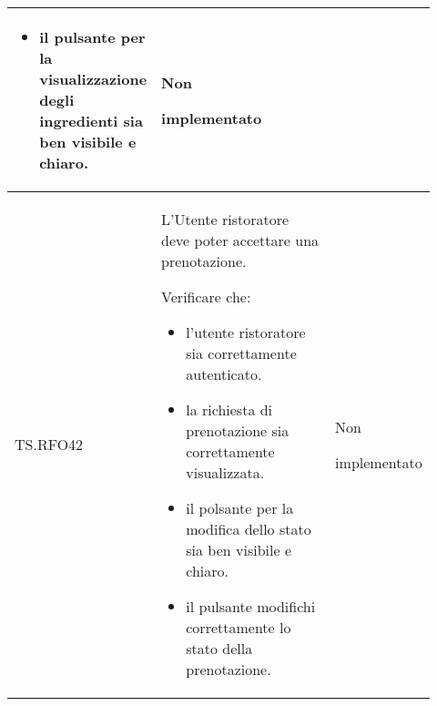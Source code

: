 \begin{longtable}{|p{0.10\linewidth}|p{0.70\linewidth}|p{0.12\linewidth}|}
\begin{itemize}
		\item il pulsante per la visualizzazione degli ingredienti sia ben visibile e chiaro.
	\end{itemize}                                           &
	Non \par implementato                                                                                                                                                   \\
	\hline
	TS.RFO42                                                                                                                        &
	L’Utente ristoratore deve poter accettare una prenotazione. \par
	Verificare che:
	\begin{itemize}
		\item l'utente ristoratore sia correttamente autenticato.
		\item la richiesta di prenotazione sia correttamente visualizzata.
		\item il polsante per la modifica dello stato sia ben visibile e chiaro.
		\item il pulsante modifichi correttamente lo stato della prenotazione.
	\end{itemize}                                                        &
	Non \par implementato                                                                                                                                                   \\
	\hline


\end{longtable}
